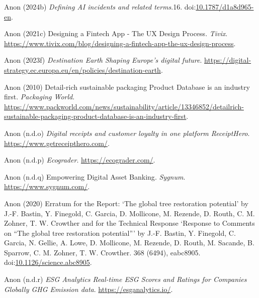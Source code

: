 \documentclass[
  letterpaper,
  DIV=11,
  numbers=noendperiod]{scrartcl}
\newlength{\cslhangindent}
\newenvironment{CSLReferences}[2] %
 {\begin{list}{}{%
  \setlength{\itemindent}{0pt}
  \setlength{\leftmargin}{0pt}
  \setlength{\parsep}{0pt}
  \ifodd #1
   \setlength{\leftmargin}{\cslhangindent}
   \setlength{\itemindent}{-1\cslhangindent}
  \fi
  \setlength{\itemsep}{#2\baselineskip}}}
 {\end{list}}
\begin{document}
\begin{CSLReferences}{0}{1}
Anon (2024b) \emph{Defining {AI} incidents and related terms}.16.
doi:\href{https://doi.org/10.1787/d1a8d965-en}{10.1787/d1a8d965-en}.

Anon (2021c) Designing a {Fintech App} - {The UX Design Process}.
\emph{Tivix}.
\url{https://www.tivix.com/blog/designing-a-fintech-app-the-ux-design-process}.

Anon (2023f) \emph{Destination {Earth} {\textbar} {Shaping Europe}'s
digital future}.
\url{https://digital-strategy.ec.europa.eu/en/policies/destination-earth}.

Anon (2010) Detail-rich sustainable packaging {Product Database} is an
industry first. \emph{Packaging World}.
\url{https://www.packworld.com/news/sustainability/article/13346852/detailrich-sustainable-packaging-product-database-is-an-industry-first}.

Anon (n.d.o) \emph{Digital receipts and customer loyalty in one platform
{\textbar} {ReceiptHero}}. \url{https://www.getreceipthero.com/}.

Anon (n.d.p) \emph{Ecograder}. \url{https://ecograder.com/}.

Anon (n.d.q) Empowering {Digital Asset Banking}. \emph{Sygnum}.
\url{https://www.sygnum.com/}.

Anon (2020) Erratum for the {Report}: {`{The} global tree restoration
potential'} by {J}.-{F}. {Bastin}, {Y}. {Finegold}, {C}. {Garcia}, {D}.
{Mollicone}, {M}. {Rezende}, {D}. {Routh}, {C}. {M}. {Zohner}, {T}. {W}.
{Crowther} and for the {Technical Response} {`{Response} to {Comments}
on {``{The} global tree restoration potential''}'} by {J}.-{F}.
{Bastin}, {Y}. {Finegold}, {C}. {Garcia}, {N}. {Gellie}, {A}. {Lowe},
{D}. {Mollicone}, {M}. {Rezende}, {D}. {Routh}, {M}. {Sacande}, {B}.
{Sparrow}, {C}. {M}. {Zohner}, {T}. {W}. {Crowther}. 368 (6494),
eabc8905.
doi:\href{https://doi.org/10.1126/science.abc8905}{10.1126/science.abc8905}.

Anon (n.d.r) \emph{{ESG Analytics} {\textbar} {Real-time ESG Scores} and
{Ratings} for {Companies Globally} {\textbar} {GHG Emission} data}.
\url{https://esganalytics.io/}.


\end{CSLReferences}
\end{document}
